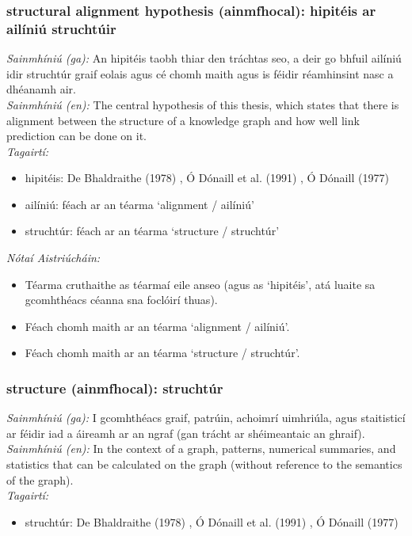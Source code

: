 \subsubsection*{structural alignment hypothesis (ainmfhocal): hipitéis ar ailíniú struchtúir}
 \noindent \textit{Sainmhíniú (ga):} An hipitéis taobh thiar den tráchtas seo, a deir go bhfuil ailíniú idir struchtúr graif eolais agus cé chomh maith agus is féidir réamhinsint nasc a dhéanamh air.
\\
 \noindent \textit{Sainmhíniú (en):} The central hypothesis of this thesis, which states that there is alignment between the structure of a knowledge graph and how well link prediction can be done on it.
\\
 \noindent \textit{Tagairtí:}
\begin{itemize}
	\item hipitéis: De Bhaldraithe (1978) \cite{de-bhaldraithe}, Ó Dónaill et al. (1991) \cite{focloir-beag}, Ó Dónaill (1977) \cite{odonaill}
	\item ailíniú: féach ar an téarma `alignment / ailíniú'
	\item struchtúr: féach ar an téarma `structure / struchtúr'
\end{itemize}

 \noindent \textit{Nótaí Aistriúcháin:}
\begin{itemize}
	\item Téarma cruthaithe as téarmaí eile anseo (agus as `hipitéis', atá luaite sa gcomhthéacs céanna sna foclóirí thuas).
	\item Féach chomh maith ar an téarma `alignment / ailíniú'.
	\item Féach chomh maith ar an téarma `structure / struchtúr'.
\end{itemize}


\subsubsection*{structure (ainmfhocal): struchtúr}
 \noindent \textit{Sainmhíniú (ga):} I gcomhthéacs graif, patrúin, achoimrí uimhriúla, agus staitisticí ar féidir iad a áireamh ar an ngraf (gan trácht ar shéimeantaic an ghraif).
\\
 \noindent \textit{Sainmhíniú (en):} In the context of a graph, patterns, numerical summaries, and statistics that can be calculated on the graph (without reference to the semantics of the graph).
\\
 \noindent \textit{Tagairtí:}
\begin{itemize}
	\item struchtúr: De Bhaldraithe (1978) \cite{de-bhaldraithe}, Ó Dónaill et al. (1991) \cite{focloir-beag}, Ó Dónaill (1977) \cite{odonaill}
\end{itemize}

